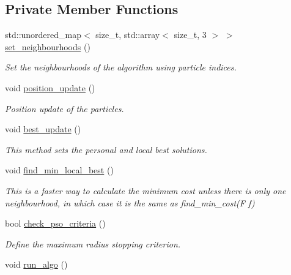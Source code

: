 \subsection*{Private Member Functions}
\begin{DoxyCompactItemize}
\item 
std\+::unordered\+\_\+map$<$ size\+\_\+t, std\+::array$<$ size\+\_\+t, 3 $>$ $>$ \hyperlink{classea_1_1_solver_3_01_p_s_ol_00_01_t_00_01_f_00_01_c_01_4_ae7599388d63b6905f4d9c49a3ad85387}{set\+\_\+neighbourhoods} ()
\begin{DoxyCompactList}\small\item\em Set the neighbourhoods of the algorithm using particle indices. \end{DoxyCompactList}\item 
void \hyperlink{classea_1_1_solver_3_01_p_s_ol_00_01_t_00_01_f_00_01_c_01_4_a9f20cae513cb6a44dddc59ef43ee206f}{position\+\_\+update} ()
\begin{DoxyCompactList}\small\item\em Position update of the particles. \end{DoxyCompactList}\item 
void \hyperlink{classea_1_1_solver_3_01_p_s_ol_00_01_t_00_01_f_00_01_c_01_4_a165112bf8f9e69d16c7a4d0680e1cd20}{best\+\_\+update} ()
\begin{DoxyCompactList}\small\item\em This method sets the personal and local best solutions. \end{DoxyCompactList}\item 
void \hyperlink{classea_1_1_solver_3_01_p_s_ol_00_01_t_00_01_f_00_01_c_01_4_ae7821ee945e33732ec24d47c88d4b310}{find\+\_\+min\+\_\+local\+\_\+best} ()
\begin{DoxyCompactList}\small\item\em This is a faster way to calculate the minimum cost unless there is only one neighbourhood, in which case it is the same as find\+\_\+min\+\_\+cost(\+F f) \end{DoxyCompactList}\item 
bool \hyperlink{classea_1_1_solver_3_01_p_s_ol_00_01_t_00_01_f_00_01_c_01_4_a474c18a8544f7ae0d5fe9d1587de2ad3}{check\+\_\+pso\+\_\+criteria} ()
\begin{DoxyCompactList}\small\item\em Define the maximum radius stopping criterion. \end{DoxyCompactList}\item 
void \hyperlink{classea_1_1_solver_3_01_p_s_ol_00_01_t_00_01_f_00_01_c_01_4_a0fa43e874bb60282a742c4c3dff651a9}{run\+\_\+algo} ()

\end{DoxyCompactItemize}
